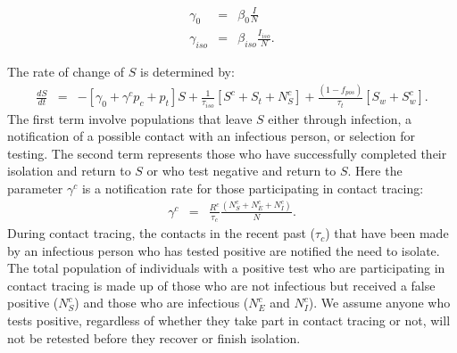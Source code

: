 \documentclass[notitlepage, superscriptaddress]{revtex4-2}
\begin{document}
\begin{eqnarray}
\label{E:infectionrates}
\gamma_{0} &=& \beta_0 \frac{I}{N} \\
% 
\gamma_{iso} &=& \beta_{iso} \frac{I_{iso}}{N}.
\end{eqnarray}

The rate of change of $S$ is determined by:
\begin{eqnarray}
\label{E:dS}
\frac{dS}{dt} &=& - [\gamma_{0}  + \gamma^{c} p_{c} +p_{t}] S + \frac{1}{\tau_{iso}}[S^{c} + S_{t} + N^{c}_{S}] + \frac{(1-f_{pos})}{\tau_{t}}[S_{w} + S^{c}_{w}].
\end{eqnarray}
The first term involve populations that leave $S$ either through infection, a notification of a possible contact with an infectious person, or selection for testing. The second term represents those who have successfully completed their isolation and return to $S$ or who test negative and return to $S$. Here the parameter $\gamma^{c}$ is a notification rate for those participating in contact tracing:
\begin{eqnarray}
\label{E:notificationrate}
\gamma^{c} &=& \frac{R^{c}}{\tau_{c}} \frac{(N^{c}_{S} + N^{c}_{E} + N^{c}_{I}) }{N}.
\end{eqnarray}
During contact tracing, the contacts in the recent past ($\tau_{c}$) that have been made by an infectious person who has tested positive are notified the need to isolate. The total population of individuals with a positive test who are participating in contact tracing is made up of those who are not infectious but received a false positive ($N^{c}_{S}$) and those who are infectious ($N^{c}_{E}$ and $N^{c}_{I}$). We assume anyone who tests positive, regardless of whether they take part in contact tracing or not, will not be retested before they recover or finish isolation. 
\end{document}
